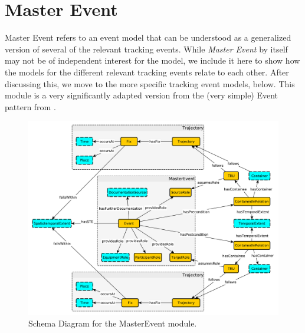 \section{Master Event}
\label{ssec:master}
Master Event refers to an event model that can be understood as a generalized version of several of the relevant tracking events. While \emph{Master Event} by itself may not be of independent interest for the model, we include it here to show how the models for the different relevant tracking events relate to each other. After discussing this, we move to the more specific tracking event models, below. This module is a very significantly adapted version from the (very simple) Event pattern from \cite{MODL}. %

\begin{figure}[tb]
\begin{center}
\includegraphics[width=\textwidth]{diagrams/master_event_no_duplicates}
\end{center}
\caption[Schema Diagram for the MasterEvent module (1)]{Schema Diagram for the MasterEvent module.}
\label{fig:masterEventnd}
\end{figure}


